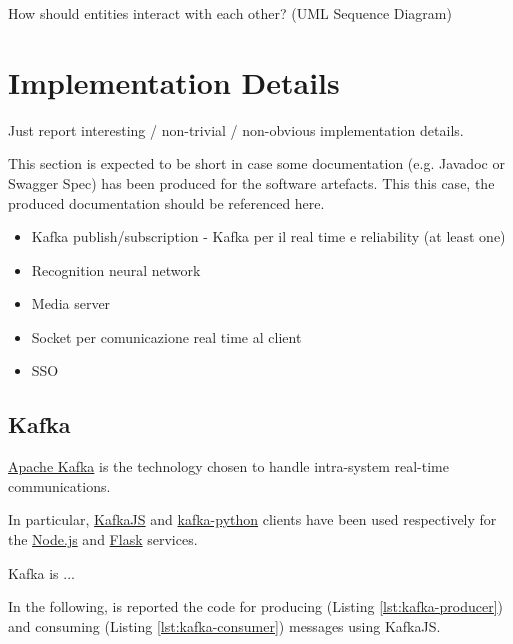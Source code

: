 \documentclass{scrartcl}
\begin{document}
    How should entities interact with each other?
%
    (UML Sequence Diagram)


    \section{Implementation Details}

    Just report interesting / non-trivial / non-obvious implementation details.

    This section is expected to be short in case some documentation (e.g. Javadoc or Swagger Spec) has been produced for the software artefacts.
%
    This this case, the produced documentation should be referenced here.

    \begin{itemize}
        \item Kafka publish/subscription - Kafka per il real time e reliability (at least one)
        \item Recognition neural network
        \item Media server
        \item Socket per comunicazione real time al client
        \item SSO
    \end{itemize}

    \subsection{Kafka}

    \href{https://kafka.apache.org}{Apache Kafka} is the technology chosen to handle intra-system real-time communications.

    In particular, \href{https://kafka.js.org}{KafkaJS} and \href{https://kafka-python.readthedocs.io/en/master/}{kafka-python} clients
    have been used respectively for the \href{https://nodejs.org/en}{Node.js} and \href{https://flask.palletsprojects.com/en/3.0.x/}{Flask} services.

    Kafka is ...

    In the following, is reported the code for producing (Listing \ref{lst:kafka-producer}) and consuming (Listing \ref{lst:kafka-consumer}) messages using KafkaJS.

    

    
\end{document}
